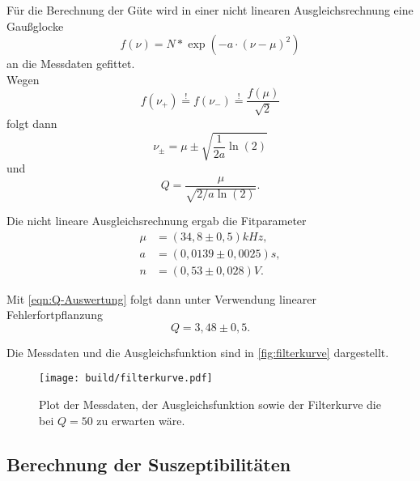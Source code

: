 Für die Berechnung der Güte wird in einer nicht linearen Ausgleichsrechnung eine
Gaußglocke
\begin{equation}
	\label{eqn:gauss-glocke}
	f(\nu) = N * \exp\left(-a \cdot (\nu - \mu)^2\right)
\end{equation}
an die Messdaten gefittet.
\\
Wegen
\begin{equation}
	f(\nu_+) \overset{!}{=} 
	f(\nu_-) \overset{!}{=} 
	\frac{f(\mu)}{\sqrt{2}}
\end{equation}
folgt dann
\begin{equation}
	\label{eqn:nu-plus-minus}
	\nu_\pm = \mu \pm \sqrt{\frac{1}{2a} \ln(2)}
\end{equation}
und 
\begin{equation}
	\label{eqn:Q-Auswertung}
	Q = \frac{\mu}{\sqrt{2/a \ln(2)}}.
\end{equation}

Die nicht lineare Ausgleichsrechnung ergab die Fitparameter
\begin{align}
	\label{eqn:fit-ergebnisse}
	\mu &= (34,8 \pm 0,5) \si{kHz}, \\
	a &= (0,0139 \pm 0,0025) \si{s}, \\
	n &= (0,53 \pm 0,028) \si{V}.
\end{align}

Mit \autoref{eqn:Q-Auswertung} folgt dann unter Verwendung linearer Fehlerfortpflanzung
\begin{equation}
	Q = 3,48 \pm 0,5.
\end{equation}

Die Messdaten und die Ausgleichsfunktion sind in \autoref{fig:filterkurve} dargestellt.

\begin{figure}
	\texttt{[image: build/filterkurve.pdf]}
	\caption{Plot der Messdaten, der Ausgleichsfunktion sowie der Filterkurve die bei
	$Q=50$ zu erwarten wäre.}
	\label{fig:filterkurve}
\end{figure}

\subsection{Berechnung der Suszeptibilitäten}
\label{sec:Berechnung der Suszeptibilitäten}

